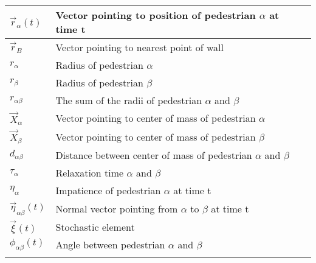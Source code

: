 \begin{center}
\begin{tabular}{lll}
\hline
$\vec{r}_{\alpha}\left( t \right) $ & Vector pointing to position of pedestrian $\alpha$ at time t & \\
\hline
$\vec{r}_{B}$ & Vector pointing to nearest point of wall & \\
\hline
$r_{\alpha}$ & Radius of pedestrian $\alpha$ & \\
\hline
$r_{\beta}$ & Radius of pedestrian $\beta$ & \\
\hline
$r_{\alpha \beta}$ & The sum of the radii of pedestrian $\alpha$ and $\beta$ & \\
\hline
$\vec{X}_{\alpha}$ & Vector pointing to center of mass of pedestrian $\alpha$ & \\
\hline
$\vec{X}_{\beta}$ & Vector pointing to center of mass of pedestrian $\beta$ & \\
\hline
$d_{\alpha \beta}$ & Distance between center of mass of pedestrian $\alpha$ and $\beta$ & \\
\hline
$\tau_{\alpha}$ & Relaxation time $\alpha$ and $\beta$ & \\
\hline
$\eta_{\alpha}$ & Impatience of pedestrian $\alpha$ at time t & \\
\hline
$\vec{\eta}_{\alpha \beta}\left( t \right)$ & Normal vector pointing from $\alpha$ to $\beta$ at time t & \\
\hline
$\vec{\xi}\left( t \right)$ & Stochastic element & \\
\hline
$\phi_{\alpha \beta} \left( t \right)$ & Angle between pedestrian $\alpha$ and $\beta$ & \\
\hline
\label{tableofconstandvar}
\end{tabular}
\end{center}